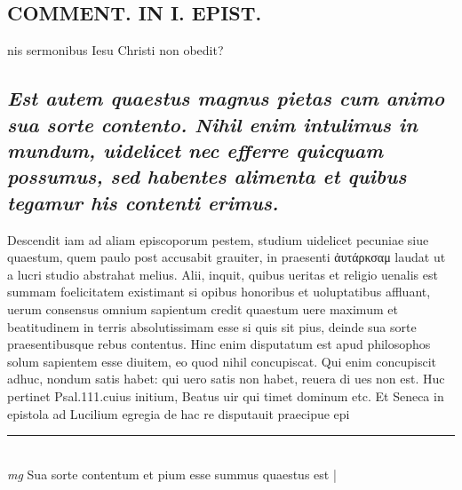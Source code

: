 \documentclass{article}
\begin{document}
\begin{pages}
\section*{COMMENT. IN I. EPIST. }\pstart nis sermonibus Iesu Christi non obedit?  \pend
{}
{}
\subsection*{\textit{Est autem quaestus magnus pietas cum animo sua sorte contento. Nihil enim intulimus in mundum, uidelicet nec efferre quicquam possumus, sed habentes alimenta et quibus tegamur his contenti erimus. }}\pstart Descendit iam ad aliam episcoporum pestem, studium uidelicet pecuniae siue quaestum, quem paulo post accusabit grauiter, in praesenti ἀυτάρκσαμ laudat ut a lucri studio abstrahat melius. Alii, inquit, quibus ueritas et religio uenalis est summam foelicitatem existimant si opibus honoribus et uoluptatibus affluant, uerum consensus omnium sapientum credit quaestum uere maximum et beatitudinem in terris absolutissimam esse si quis sit pius, deinde sua sorte praesentibusque rebus contentus. Hinc enim disputatum est apud philosophos solum sapientem esse diuitem, eo quod nihil concupiscat. Qui enim concupiscit adhuc, nondum satis habet: qui uero satis non habet, reuera di ues non est. Huc pertinet Psal.111.cuius initium, Beatus uir qui timet dominum etc. Et Seneca in epistola ad Lucilium egregia de hac re disputauit praecipue epi\pend
\vspace{0.5cm}\noindent
\vspace{0.2cm}\rule{1cm}{0.2pt}\\ 
\hspace{0.2cm}\textit{mg}
\footnotesize Sua sorte contentum et pium esse summus quaestus est 
\normalsize| 

\end{pages}
\end{document}
